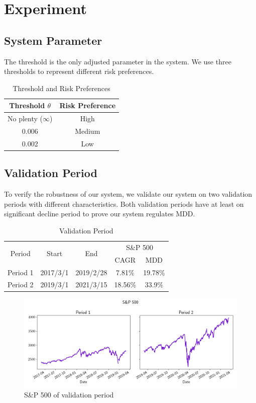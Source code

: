 \section{Experiment}

\subsection{System Parameter}
The threshold is the only adjusted parameter in the system.
We use three thresholds to represent different risk preferences.  
\begin{table}[htb]
    \centering
    \begin{tabular}{||c|c||}
    \hline \hline
    Threshold $\theta$ & Risk Preference \\ \hline
    No plenty ($\infty$) & High \\ \hline
    0.006 & Medium      \\ \hline
    0.002 & Low      \\ \hline \hline
    \end{tabular}
    \caption{Threshold and Risk Preferences}
    \label{tab:threshold}
\end{table}

\subsection{Validation Period}
To verify the robustness of our system, we validate our system on two validation periods with different characteristics. Both validation periods have at least on significant decline period to prove our system regulates MDD.
\begin{table}[htb]
    \centering
    \begin{tabular}{||c|c|c|c|c||}
    \hline \hline
    \multirow{2}{*}{Period} &
    \multirow{2}{*}{Start} &
    \multirow{2}{*}{End} &
    \multicolumn{2}{c|}{S\&P 500} \\ 
    \cline{4-5} &{} &{} & CAGR & MDD \\ \hline \hline
    Period 1 & 2017/3/1 & 2019/2/28 & 7.81\% & 19.78\% \\ \hline
    Period 2 & 2019/3/1 & 2021/3/15 & 18.56\% & 33.9\% \\    
    \hline \hline
    \end{tabular}
    \caption{Validation Period}
    \label{tab:validation_period}
\end{table}
\begin{figure}
    \centering
    \includegraphics[width=15cm]{images/sp500.png}
    \caption{S\&P 500 of validation period}
    \label{fig:my_label}
\end{figure}

